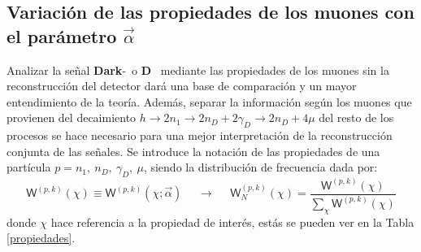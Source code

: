 \subsection{Variación de las propiedades de los muones con el parámetro $\vec{\alpha}$}

Analizar la señal \textbf{Dark}-\SUSY ~o \MSSM\textbf{D}~ mediante las propiedades de los muones sin la reconstrucción del detector dará una base de comparación y un mayor entendimiento de la teoría. Además, separar la información según los muones que provienen del decaimiento $h \rightarrow 2n_1 \rightarrow 2n_D + 2\gamma_D \rightarrow 2n_D + 4\mu$ del resto de los procesos se hace necesario para una mejor interpretación de la reconstrucción conjunta de las señales. Se introduce la notación de las propiedades de una partícula $p= n_1, ~n_D, ~\gamma_D, ~\mu$, siendo la distribución de frecuencia dada por:
\begin{equation}\label{Wpk}
\textsf{W}^{(p,k)} (\chi) \equiv \textsf{W}^{(p,k)} (\chi; \vec{\alpha}) ~~~~~~ \longrightarrow ~~~~~~ \textsf{W}^{(p,k)}_N (\chi) = \dfrac{\textsf{W}^{(p,k)} (\chi)}{ \sum\limits_\chi \textsf{W}^{(p,k)} (\chi)}
\end{equation}
donde $\chi$ hace referencia a la propiedad de interés, estás se pueden ver en la Tabla \ref{propiedades}.

